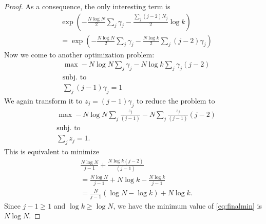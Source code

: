 \documentclass[12pt]{article}
\numberwithin{equation}{section}
\numberwithin{equation}{section}
\theoremstyle{definition}
\renewcommand{\1}{\bf 1}
\begin{document}
\begin{proof}
As a consequence, the only interesting term is 
\begin{equation}\label{eq:interest}
\begin{split}
&\exp\left(- \frac{N\log N}{2} \sum_{j} \gamma_{j} -  \frac{\sum_{j}(j-2)N_{j}}{2}\log k  \right)\\
&= \exp\left(  -\frac{N\log N}{2} \sum_{j}\gamma_{j}- \frac{N\log k}{2}\sum_{j}(j-2)\gamma_{j}\right)
\end{split}
\end{equation}
Now we come to another optimization problem:
\begin{equation}\label{eq:opt2}
\begin{array}{ll}
&\max - N\log N \sum_{j}\gamma_{j} - N\log k \sum_{j} \gamma_{j} (j-2)\\
& \text{subj. to}\\
& \sum_{j} (j-1) \gamma_{j}=1
\end{array}
\end{equation}
We again transform it to $z_{j}=(j-1) \gamma_{j}$ to reduce the problem to
\begin{equation}\label{eq:optred}
\begin{array}{ll}
& \max - N\log N \sum_{j} \frac{z_{j}}{(j-1)} - N \sum_{j} \frac{z_{j}}{(j-1)} (j-2)\\
& \text{subj. to}\\
& \sum_{j} z_{j}=1.
\end{array}
\end{equation} 
This is equivalent to minimize 
\begin{equation}\label{eq:finalmin}
\begin{split}
&\frac{N\log N}{j-1} + \frac{N \log k (j-2)}{(j-1)}\\
&= \frac{N\log N}{j-1} + N\log k -\frac{N\log k}{j-1}\\
&= \frac{N}{j-1} \left( \log N - \log k \right) + N\log k. 
\end{split}
\end{equation}
Since $j-1\ge 1$ and $\log k\ge \log N$, we have the minimum value of \eqref{eq:finalmin} is $N\log N$.  

\end{proof}
\end{document}
